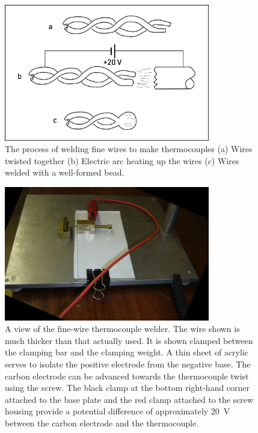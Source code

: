\begin{figure}
	\centering
	\includegraphics[width=0.8\textwidth]{Figures/TCWelding}
	\decoRule

\caption[Welding process schematic]{The process of welding fine wires to make
thermocouples (a) Wires twisted together (b) Electric arc heating up the wires
(c) Wires welded with a well-formed bead. }

\label{fig:WeldingSteps}
\end{figure}


\begin{figure}
	\centering
	\includegraphics[width=0.8\textwidth]{Figures/Welder2.jpg}
	\decoRule

\caption[Fine-wire welder]{A view of the fine-wire thermocouple welder. The wire
shown is much thicker than that actually used. It is shown clamped between the
clamping bar and the clamping weight. A thin sheet of acrylic serves to isolate
the positive electrode from the negative base. The carbon electrode can be
advanced towards the thermocouple twist using the screw. The black clamp at the
bottom right-hand corner attached to the base plate and the red clamp attached
to the screw housing provide a potential difference of approximately \SI{20}{V}
between the carbon electrode and the thermocouple.}


\label{fig:FineWireWelder}
\end{figure}



